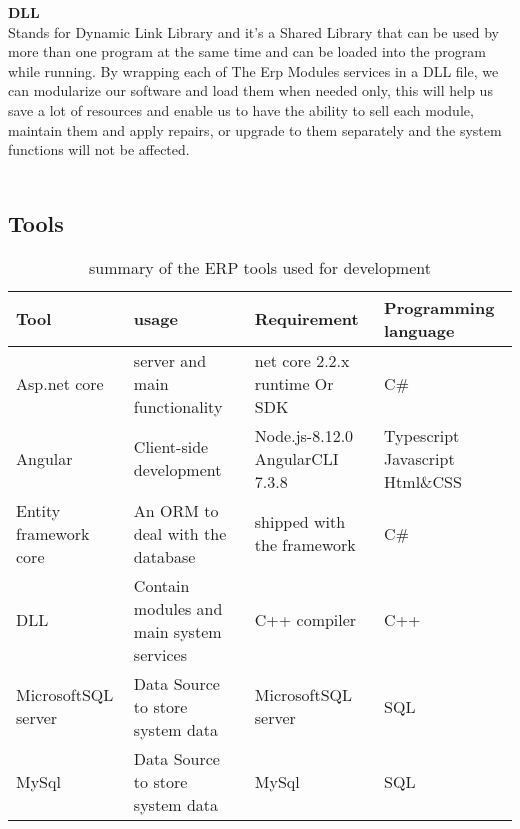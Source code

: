 \begin{adjustwidth}{2cm}{}
    \par\vspace {.5cm}
    \textbf{DLL}\\
        Stands for Dynamic Link Library and it’s a Shared Library that can be used by more than one program at the same time and can be loaded into the program while running.
By wrapping each of The Erp Modules services in a DLL file, we can modularize our software and load them when needed only, this will help us save a lot of resources and enable us to have the ability to sell each module, maintain them and apply repairs, or upgrade to them separately and the system functions will not be affected.
\\\\
\end{adjustwidth}


\subsection{Tools}

\begin{table}[h!]
\centering
\begin{tabular}{ |p{3cm}|p{3cm}|p{3cm}|p{3cm}|  }
    \hline
    \textbf{Tool} & \textbf{usage} & \textbf{Requirement} & \textbf{Programming language}\\
    \hline
    Asp.net core  & server and main functionality  & net core 2.2.x
    runtime
    Or SDK  & C\#\\
    \hline
    Angular  & Client-side development  & Node.js-8.12.0
    AngularCLI 7.3.8  & Typescript Javascript Html\&CSS\\
    \hline
    Entity framework
core & An ORM to deal with the
database & shipped with the
framework & C\#\\
    \hline
    DLL & Contain modules and main
    system services & C++ compiler & C++\\
    \hline
    MicrosoftSQL
server & Data Source to store
system data & MicrosoftSQL
server & SQL\\
    \hline
    MySql & Data Source to store
    system data & MySql & SQL\\
    \hline
\end{tabular}
\caption{summary of the ERP tools used for development}
\label{table:1}
\end{table}


